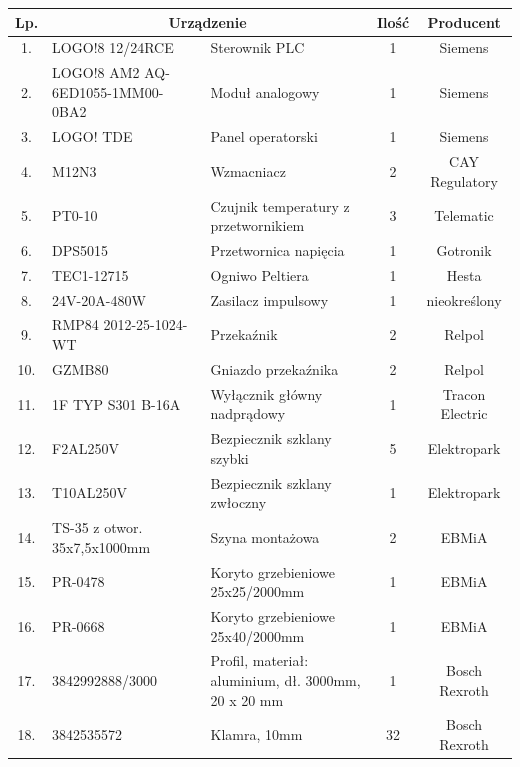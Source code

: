 \documentclass[oneside]{mgr}
\begin{document}
\begin{table}
\footnotesize
\begin{tabularx}{\textwidth}{|c|X|X|c|c|}
\hline
\rowcolor{lightgray}
    Lp. & \multicolumn{2}{|c|}{Urządzenie}        & Ilość          & Producent                                    \\\hline
    1.      &LOGO!8 12/24RCE     &Sterownik PLC      &1       &Siemens\\\hline
    2.      &LOGO!8 AM2 AQ-6ED1055-1MM00-0BA2    &Moduł analogowy      &1       &Siemens\\\hline
    3.      &LOGO! TDE    &Panel operatorski      &1       &Siemens\\\hline
    4.      &M12N3    &Wzmacniacz      &2       &CAY Regulatory\\\hline
    5.      &PT0-10    &Czujnik temperatury z przetwornikiem      &3       &Telematic\\\hline
    6.      &DPS5015    &Przetwornica napięcia      &1       &Gotronik\\\hline
    7.      &TEC1-12715    &Ogniwo Peltiera      &1       &Hesta\\\hline
    8.      &24V-20A-480W     &Zasilacz impulsowy     &1       & 	nieokreślony\\\hline
    9.      &RMP84 2012-25-1024-WT      &Przekaźnik     &2       &Relpol\\\hline
    10.      &GZMB80      &Gniazdo przekaźnika     &2       &Relpol\\\hline
    11.      &1F TYP S301 B-16A     &Wyłącznik główny nadprądowy     &1       &Tracon Electric\\\hline
    12.      &F2AL250V      &Bezpiecznik szklany szybki     &5       &Elektropark\\\hline
    13.      &T10AL250V      &Bezpiecznik szklany zwłoczny     &1      &Elektropark\\\hline
    14.      &TS-35 z otwor. 35x7,5x1000mm      &Szyna montażowa     &2      &EBMiA\\\hline
    15.      &PR-0478     &Koryto grzebieniowe 25x25/2000mm     &1      &EBMiA\\\hline
    16.      &PR-0668    &Koryto grzebieniowe 25x40/2000mm     &1      &EBMiA\\\hline
    17.      &3842992888/3000    &Profil, materiał: aluminium, dł. 3000mm, 20 x 20 mm   &1      &Bosch Rexroth\\\hline
    18.      &3842535572   &Klamra, 10mm     &32      &Bosch Rexroth\\\hline

\end{tabularx}
\end{table}
\end{document}
